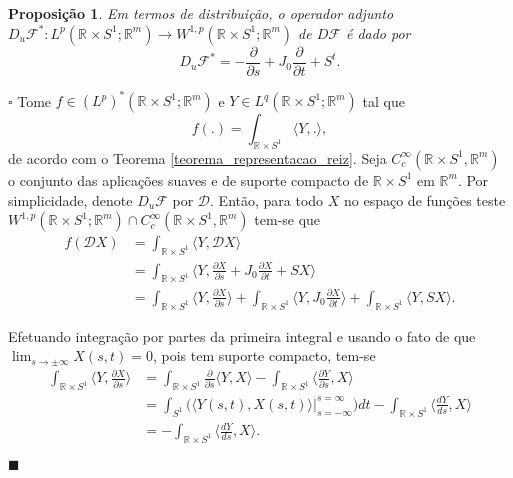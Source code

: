 \documentclass[12pt]{book}
\newtheorem{proposicao}[teorema]{Proposição}
\newenvironment{prova}[1]{$\square$ #1}{\hfill$\blacksquare$}
\newcommand{\bigparenteses}[1]{\Big( #1 \Big) }
\newcommand{\circulo}{S^{1}}
\newcommand{\diferencialfloer}{D\operadorFloer}
\newcommand{\diferencialfloerponto}[1]{D_{#1}\operadorFloer}
\newcommand{\diferencialfloeradjponto}[1]{D_{#1}\operadorFloer^{*}}
\newcommand{\diferencialfloerabrev}{\mathcal{D}}
\newcommand{\derivada}[2]{\frac{d #1}{d #2}}
\newcommand{\derivadaparcial}[2]{\frac{\partial #1}{\partial #2}}
\newcommand{\espacoLpcontradominio}[2]{L^{p}(#1;#2)}
\newcommand{\espacoLpGeral}[2]{L^{#1}(#2)}
\newcommand{\espacoLpdual}{(L^{p})^{*}(\retacartesianocirculo;\real{m})}
\newcommand{\espacosobolevcontradominio}[2]{W^{1,p}(#1;#2)}
\newcommand{\estruturacomplexa}{J_{0}}
\newcommand{\funcoessupcompactcontradom}[2]{C^{\infty}_{c}(#1, #2)}
\newcommand{\operadorFloer}{\mathcal{F}}
\newcommand{\produtointerno}[2]{\langle #1, #2 \rangle}
\newcommand{\retacartesianocirculo}{\real{} \times \circulo}
\newcommand{\real}[1]{\mathbb{R}^{#1}}
\begin{document}
	\begin{proposicao}\label{proposicao_diferencial_floer_adjunto}
		Em termos de distribuição, o operador adjunto $\diferencialfloeradjponto{u}:\espacoLpcontradominio{\retacartesianocirculo}{\real{m}} \to \espacosobolevcontradominio{\retacartesianocirculo}{\real{m}}$ de $\diferencialfloer$ é dado por
		$$
		\diferencialfloeradjponto{u}=-\derivadaparcial{}{s}+\estruturacomplexa \derivadaparcial{}{t}+S^{t}.
		$$
	\end{proposicao}
	\begin{prova} Tome $f \in \espacoLpdual$ e $Y \in \espacoLpGeral{q}{\retacartesianocirculo;\real{m}}$ tal que 
		$$
		f(.) = \int_{\retacartesianocirculo}\produtointerno{Y}{.},
		$$
		de acordo com o Teorema \ref{teorema_representacao_reiz}. Seja  $\funcoessupcompactcontradom{\retacartesianocirculo}{\real{m}}$ o conjunto das aplicações suaves e de suporte compacto de $\retacartesianocirculo$ em $\real{m}$. Por simplicidade, denote $\diferencialfloerponto{u}$ por $\diferencialfloerabrev$. Então, para todo $X$ no espaço de funções teste $\espacosobolevcontradominio{\retacartesianocirculo}{\real{m}} \cap \funcoessupcompactcontradom{\retacartesianocirculo}{\real{m}}$ tem-se que
		$$
		\begin{aligned}
		f(\diferencialfloerabrev X)
		&= \int_{\retacartesianocirculo}\produtointerno{Y}{\diferencialfloerabrev X}
		\\
		&=\int_{\retacartesianocirculo}\produtointerno{Y}{\derivadaparcial{ X}{s}+\estruturacomplexa\derivadaparcial{ X}{t}+S X}
		\\
		&=
		\int_{\retacartesianocirculo}\produtointerno{Y}{\derivadaparcial{ X}{s}} + \int_{\retacartesianocirculo}\produtointerno{Y}{\estruturacomplexa\derivadaparcial{ X}{t}} + \int_{\retacartesianocirculo}\produtointerno{Y}{S X}.
		\end{aligned}
		$$
		
		Efetuando integração por partes da primeira integral e usando o fato de que $\lim_{s\to \pm \infty} X(s,t) = 0$, pois tem suporte compacto, tem-se
		$$
		\begin{aligned}
		\int_{\retacartesianocirculo}\produtointerno{Y}{\derivadaparcial{ X}{s}}
		&=\int_{\retacartesianocirculo}\derivadaparcial{}{s}\produtointerno{Y}{ X} - \int_{\retacartesianocirculo}\produtointerno{\derivadaparcial{Y}{s}}{ X} 
		\\
		&=\int_{\circulo}\bigparenteses{\produtointerno{Y(s,t)}{ X(s,t)}\Big|_{s=-\infty}^{s=\infty}}dt -\int_{\retacartesianocirculo}\produtointerno{\derivada{Y}{s}}{ X}
		\\
		&=-\int_{\retacartesianocirculo}\produtointerno{\derivada{Y}{s}}{ X}.
		\end{aligned}
		$$
		

\end{prova}
\end{document}
